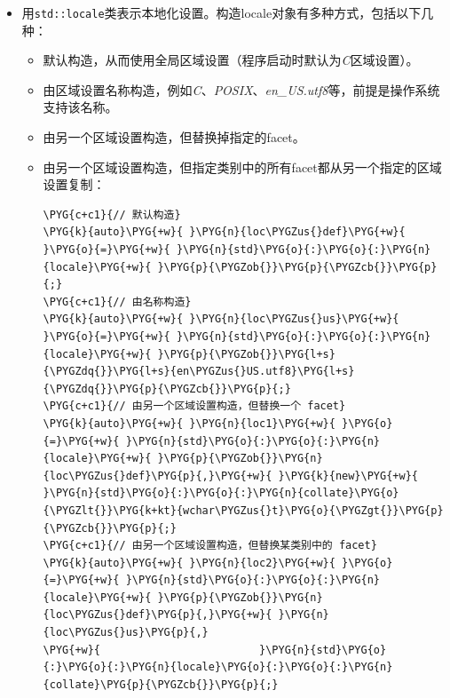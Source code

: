 \begin{itemize}
\item 用\texttt{std::\allowbreak{}locale}类表示本地化设置。构造locale对象有多种方式，包括以下几种：



\begin{itemize}
\item 默认构造，从而使用全局区域设置（程序启动时默认为\textit{C}区域设置）。



\item 由区域设置名称构造，例如\textit{C}、\textit{POSIX}、\textit{en\_US.utf8}等，前提是操作系统支持该名称。



\item 由另一个区域设置构造，但替换掉指定的facet。



\item 由另一个区域设置构造，但指定类别中的所有facet都从另一个指定的区域设置复制：



\begin{codeblockbg}
\begin{Verbatim}[commandchars=\\\{\},breaklines=true,breakanywhere=true,fontsize=\codefont,xleftmargin=17bp]
\PYG{c+c1}{// 默认构造}
\PYG{k}{auto}\PYG{+w}{ }\PYG{n}{loc\PYGZus{}def}\PYG{+w}{ }\PYG{o}{=}\PYG{+w}{ }\PYG{n}{std}\PYG{o}{:}\PYG{o}{:}\PYG{n}{locale}\PYG{+w}{ }\PYG{p}{\PYGZob{}}\PYG{p}{\PYGZcb{}}\PYG{p}{;}
\PYG{c+c1}{// 由名称构造}
\PYG{k}{auto}\PYG{+w}{ }\PYG{n}{loc\PYGZus{}us}\PYG{+w}{ }\PYG{o}{=}\PYG{+w}{ }\PYG{n}{std}\PYG{o}{:}\PYG{o}{:}\PYG{n}{locale}\PYG{+w}{ }\PYG{p}{\PYGZob{}}\PYG{l+s}{\PYGZdq{}}\PYG{l+s}{en\PYGZus{}US.utf8}\PYG{l+s}{\PYGZdq{}}\PYG{p}{\PYGZcb{}}\PYG{p}{;}
\PYG{c+c1}{// 由另一个区域设置构造，但替换一个 facet}
\PYG{k}{auto}\PYG{+w}{ }\PYG{n}{loc1}\PYG{+w}{ }\PYG{o}{=}\PYG{+w}{ }\PYG{n}{std}\PYG{o}{:}\PYG{o}{:}\PYG{n}{locale}\PYG{+w}{ }\PYG{p}{\PYGZob{}}\PYG{n}{loc\PYGZus{}def}\PYG{p}{,}\PYG{+w}{ }\PYG{k}{new}\PYG{+w}{ }\PYG{n}{std}\PYG{o}{:}\PYG{o}{:}\PYG{n}{collate}\PYG{o}{\PYGZlt{}}\PYG{k+kt}{wchar\PYGZus{}t}\PYG{o}{\PYGZgt{}}\PYG{p}{\PYGZcb{}}\PYG{p}{;}
\PYG{c+c1}{// 由另一个区域设置构造，但替换某类别中的 facet}
\PYG{k}{auto}\PYG{+w}{ }\PYG{n}{loc2}\PYG{+w}{ }\PYG{o}{=}\PYG{+w}{ }\PYG{n}{std}\PYG{o}{:}\PYG{o}{:}\PYG{n}{locale}\PYG{+w}{ }\PYG{p}{\PYGZob{}}\PYG{n}{loc\PYGZus{}def}\PYG{p}{,}\PYG{+w}{ }\PYG{n}{loc\PYGZus{}us}\PYG{p}{,}
\PYG{+w}{                         }\PYG{n}{std}\PYG{o}{:}\PYG{o}{:}\PYG{n}{locale}\PYG{o}{:}\PYG{o}{:}\PYG{n}{collate}\PYG{p}{\PYGZcb{}}\PYG{p}{;}
\end{Verbatim}
\end{codeblockbg}



\end{itemize}
\end{itemize}
